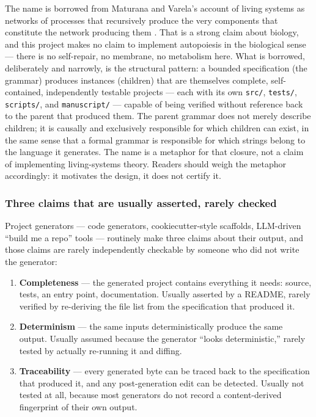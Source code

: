 \documentclass[
]{article}
\providecommand{\tightlist}{%
  \setlength{\itemsep}{0pt}\setlength{\parskip}{0pt}}
\begin{document}
The name is borrowed from Maturana and Varela's account of living
systems as networks of processes that recursively produce the very
components that constitute the network producing them
\citep{maturana_varela_1980}. That is a strong claim about biology, and
this project makes no claim to implement autopoiesis in the biological
sense --- there is no self-repair, no membrane, no metabolism here. What
is borrowed, deliberately and narrowly, is the structural pattern: a
bounded specification (the grammar) produces instances (children) that
are themselves complete, self-contained, independently testable projects
--- each with its own \texttt{src/}, \texttt{tests/}, \texttt{scripts/},
and \texttt{manuscript/} --- capable of being verified without reference
back to the parent that produced them. The parent grammar does not
merely describe children; it is causally and exclusively responsible for
which children can exist, in the same sense that a formal grammar is
responsible for which strings belong to the language it generates. The
name is a metaphor for that closure, not a claim of implementing
living-systems theory. Readers should weigh the metaphor accordingly: it
motivates the design, it does not certify it.

\subsubsection{Three claims that are usually asserted, rarely
checked}\label{three-claims-that-are-usually-asserted-rarely-checked}

Project generators --- code generators, cookiecutter-style scaffolds,
LLM-driven ``build me a repo'' tools --- routinely make three claims
about their output, and those claims are rarely independently checkable
by someone who did not write the generator:

\begin{enumerate}
\def\labelenumi{\arabic{enumi}.}
\tightlist
\item
  \textbf{Completeness} --- the generated project contains everything it
  needs: source, tests, an entry point, documentation. Usually asserted
  by a README, rarely verified by re-deriving the file list from the
  specification that produced it.
\item
  \textbf{Determinism} --- the same inputs deterministically produce the
  same output. Usually assumed because the generator ``looks
  deterministic,'' rarely tested by actually re-running it and diffing.
\item
  \textbf{Traceability} --- every generated byte can be traced back to
  the specification that produced it, and any post-generation edit can
  be detected. Usually not tested at all, because most generators do not
  record a content-derived fingerprint of their own output.
\end{enumerate}
\end{document}
